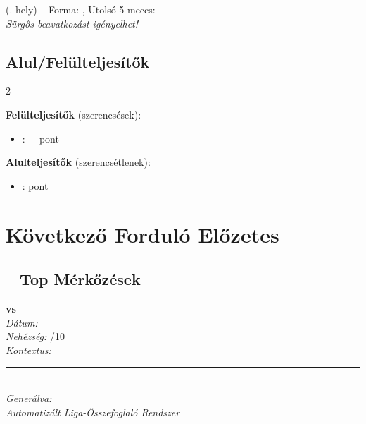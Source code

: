 \documentclass[11pt,a4paper]{article}
\begin{document}
\begin{tcolorbox}[colback=red!5,colframe=red!40]
        \textbf{} (. hely) -- 
        Forma: , 
        Utolsó 5 meccs:  \\
        \textit{Sürgős beavatkozást igényelhet!} \\[0.5em]
\end{tcolorbox}

\subsection*{Alul/Felülteljesítők}

\begin{multicols}{2}

\textbf{Felülteljesítők} (szerencsések):
\begin{itemize}
    \item {}: + pont
\end{itemize}

\columnbreak

\textbf{Alulteljesítők} (szerencsétlenek):
\begin{itemize}
    \item {}:  pont
\end{itemize}

\end{multicols}

\newpage

\section*{Következő Forduló Előzetes}

\subsection*{\faCalendar~ Top Mérkőzések}

    \begin{tcolorbox}[colback=blue!5,colframe=blue!30]
    \textbf{ vs } \\
    \textit{Dátum:}  \\
    \textit{Nehézség:} /10 \\
    \textit{Kontextus:} 
    \end{tcolorbox}
    \vspace{0.5em}

\vfill

\begin{center}
\rule{0.5\textwidth}{0.4pt} \\
\textit{Generálva: } \\
\textit{Automatizált Liga-Összefoglaló Rendszer}
\end{center}
\end{document}
